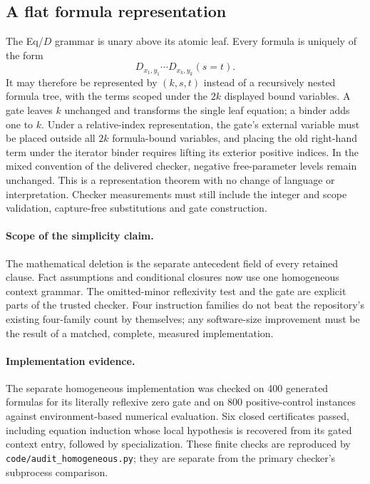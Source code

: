 \subsection{A flat formula representation}

The Eq/$D$ grammar is unary above its atomic leaf.  Every formula is
uniquely of the form
\[
 D_{x_1,y_1}\cdots D_{x_k,y_k}(s=t).
\]
It may therefore be represented by $(k,s,t)$ instead of a recursively
nested formula tree, with the terms scoped under the $2k$ displayed
bound variables.  A gate leaves $k$ unchanged and transforms the single
leaf equation; a binder adds one to $k$.  Under a relative-index
representation, the gate's external variable must be placed outside all
$2k$ formula-bound variables, and placing the old right-hand term under the iterator binder
requires lifting its exterior positive indices. In the mixed convention
of the delivered checker, negative free-parameter levels remain unchanged.  This is a representation theorem with no change
of language or interpretation.  Checker measurements must still include
the integer and scope validation, capture-free substitutions and gate
construction.

\paragraph{Scope of the simplicity claim.}
The mathematical deletion is the separate antecedent field of every
retained clause.  Fact assumptions and conditional closures now use one
homogeneous context grammar.  The omitted-minor reflexivity test and the
gate are explicit parts of the trusted checker.  Four instruction
families do not beat the repository's existing four-family count by
themselves; any software-size improvement must be the result of a
matched, complete, measured implementation.


\paragraph{Implementation evidence.}
The separate homogeneous implementation was checked on 400 generated
formulas for its literally reflexive zero gate and on 800 positive-control
instances against environment-based numerical evaluation. Six closed
certificates passed, including equation induction whose local hypothesis
is recovered from its gated context entry, followed by specialization.
These finite checks are reproduced by \texttt{code/audit\_homogeneous.py};
they are separate from the primary checker's subprocess comparison.
